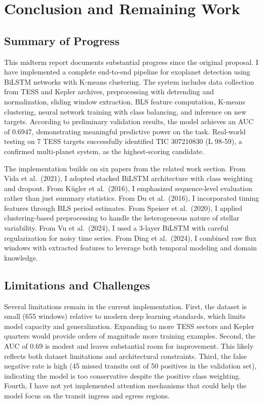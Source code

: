 \documentclass[letterpaper]{article}
\begin{document}
\section{Conclusion and Remaining Work}

\subsection{Summary of Progress}

This midterm report documents substantial progress since the original proposal. I have implemented a complete end-to-end pipeline for exoplanet detection using BiLSTM networks with K-means clustering. The system includes data collection from TESS and Kepler archives, preprocessing with detrending and normalization, sliding window extraction, BLS feature computation, K-means clustering, neural network training with class balancing, and inference on new targets. According to preliminary validation results, the model achieves an AUC of 0.6947, demonstrating meaningful predictive power on the task. Real-world testing on 7 TESS targets successfully identified TIC 307210830 (L 98-59), a confirmed multi-planet system, as the highest-scoring candidate.

The implementation builds on six papers from the related work section. From Vida et al.\ (2021), I adopted stacked BiLSTM architecture with class weighting and dropout. From Kügler et al.\ (2016), I emphasized sequence-level evaluation rather than just summary statistics. From Du et al.\ (2016), I incorporated timing features through BLS period estimates. From Speiser et al.\ (2020), I applied clustering-based preprocessing to handle the heterogeneous nature of stellar variability. From Vu et al.\ (2024), I used a 3-layer BiLSTM with careful regularization for noisy time series. From Ding et al.\ (2024), I combined raw flux windows with extracted features to leverage both temporal modeling and domain knowledge.

\subsection{Limitations and Challenges}

Several limitations remain in the current implementation. First, the dataset is small (655 windows) relative to modern deep learning standards, which limits model capacity and generalization. Expanding to more TESS sectors and Kepler quarters would provide orders of magnitude more training examples. Second, the AUC of 0.69 is modest and leaves substantial room for improvement. This likely reflects both dataset limitations and architectural constraints. Third, the false negative rate is high (45 missed transits out of 50 positives in the validation set), indicating the model is too conservative despite the positive class weighting. Fourth, I have not yet implemented attention mechanisms that could help the model focus on the transit ingress and egress regions.
\end{document}
